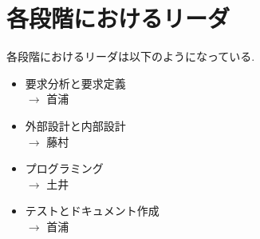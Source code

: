 \documentclass[dvipdfmx, 11pt]{jsarticle}
\begin{document}
\section{各段階におけるリーダ}
    各段階におけるリーダは以下のようになっている.
    \begin{itemize}
        \item 要求分析と要求定義 \\       
            $\rightarrow$ 首浦
        \item 外部設計と内部設計 \\
            $\rightarrow$ 藤村
        \item プログラミング \\
            $\rightarrow$ 土井
        \item テストとドキュメント作成 \\
            $\rightarrow$ 首浦
    \end{itemize}

% 
% 
\end{document}
